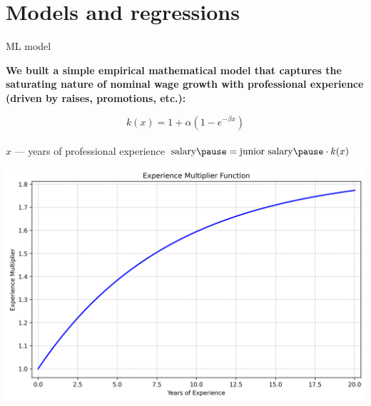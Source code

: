 \section{Models and regressions}


\begin{frame}[t]{ML model}

    \textbf{We built a simple empirical mathematical model
        that captures the saturating nature of nominal wage growth with professional experience
        (driven by raises, promotions, etc.):}

    \pause

    \begin{equation}
    k(x) = 1 + \alpha (1 - e^{-\beta x})
    \end{equation}
    \pause
    \\[.5cm]
    \centering
    $x$ --- years of professional experience
    \pause
    $\textrm{salary} \pause = \textrm{junior salary} \pause \cdot k(x)$
\end{frame}

\begin{frame}[plain]
    \includegraphics[width=.8\textwidth]{img/experience_multiplier}
\end{frame}

